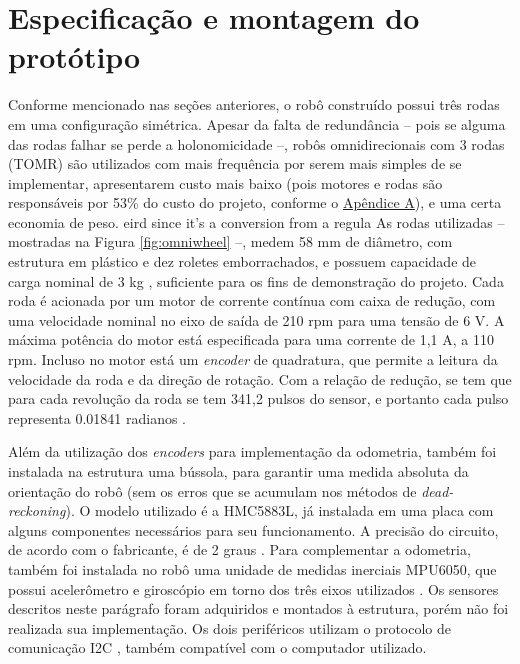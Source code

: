

\section{Especificação e montagem do protótipo}
\label{sec:montagem}

Conforme mencionado nas seções anteriores, o robô construído possui três rodas em uma configuração simétrica. Apesar da falta de redundância -- pois se alguma das rodas falhar se perde a holonomicidade --, robôs omnidirecionais com 3 rodas (TOMR) são utilizados com mais frequência por serem mais simples de se implementar, apresentarem custo mais baixo (pois motores e rodas são responsáveis por 53\% do custo do projeto, conforme o \hyperref[sec:custo]{Apêndice A}), e uma certa economia de peso.
eird since it's a conversion from a regula
As rodas utilizadas -- mostradas na Figura \ref{fig:omniwheel} --, medem 58 mm de diâmetro, com estrutura em plástico e dez roletes emborrachados, e possuem capacidade de carga nominal de 3 kg \citep{omniwheel}, suficiente para os fins de demonstração do projeto. Cada roda é acionada por um motor de corrente contínua com caixa de redução, com uma velocidade nominal no eixo de saída de 210 rpm para uma tensão de 6 V. A máxima potência do motor está especificada para uma corrente de 1,1 A, a 110 rpm. Incluso no motor está um \textit{encoder} de quadratura, que permite a leitura da velocidade da roda e da direção de rotação. Com a relação de redução, se tem que para cada revolução da roda se tem 341,2 pulsos do sensor, e portanto cada pulso representa 0.01841 radianos \citep{motor}.

Além da utilização dos \textit{encoders} para implementação da odometria, também foi instalada na estrutura uma bússola, para garantir uma medida absoluta da orientação do robô (sem os erros que se acumulam nos métodos de \textit{dead-reckoning}). O modelo utilizado é a HMC5883L, já instalada em uma placa com alguns componentes necessários para seu funcionamento. A precisão do circuito, de acordo com o fabricante, é de 2 graus \citep{HMC5883L}. Para complementar a odometria, também foi instalada no robô uma unidade de medidas inerciais MPU6050, que possui acelerômetro e giroscópio em torno dos três eixos utilizados \citep{MPU6050}. Os sensores descritos neste parágrafo foram adquiridos e montados à estrutura, porém não foi realizada sua implementação. Os dois periféricos utilizam o protocolo de comunicação I2C \citep{semiconductors2000i2c}, também compatível com o computador utilizado.

